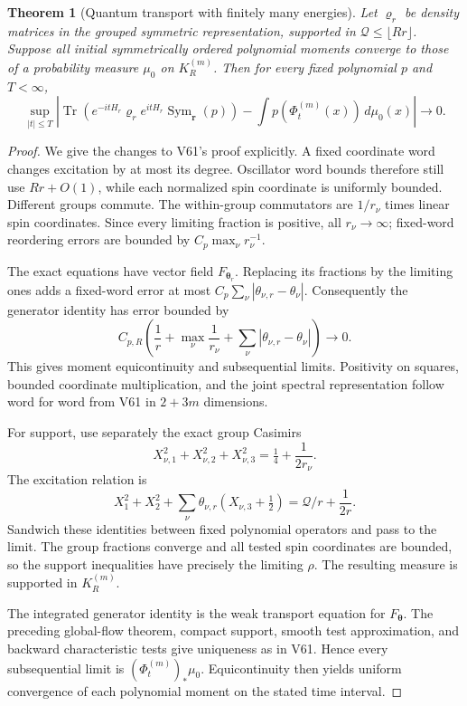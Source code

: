 \documentclass[11pt]{article}
\newtheorem{theorem}{Theorem}[section]
\theoremstyle{remark}
\begin{document}
\begin{theorem}[Quantum transport with finitely many energies]
\label{thm:v20v62-transport}
Let \(\varrho_r\) be density matrices in the grouped
symmetric representation, supported in
\(\mathcal Q\leq\lfloor Rr\rfloor\).  Suppose all initial
symmetrically ordered polynomial moments converge to
those of a probability measure \(\mu_0\) on \(K_R^{(m)}\).
Then for every fixed polynomial \(p\) and \(T<\infty\),
\[
 \sup_{|t|\leq T}\left|
 \operatorname{Tr}\!\left(e^{-itH_r}\varrho_re^{itH_r}
                         \operatorname{Sym}_{\boldsymbol r}(p)\right)
   -\int p(\Phi_t^{(m)}(x))\,d\mu_0(x)\right|
                          \longrightarrow0 .
\]
\end{theorem}
\begin{proof}
We give the changes to V61's proof explicitly.
A fixed coordinate word changes excitation by at most
its degree.  Oscillator word bounds therefore still
use \(Rr+O(1)\), while each normalized spin coordinate
is uniformly bounded.  Different groups commute.
The within-group commutators are \(1/r_\nu\) times
linear spin coordinates.  Since every limiting fraction
is positive, all \(r_\nu\to\infty\); fixed-word
reordering errors are bounded by
\(C_p\max_\nu r_\nu^{-1}\).

The exact equations have vector field \(F_{\boldsymbol\theta_r}\).
Replacing its fractions by the limiting ones adds a
fixed-word error at most
\(C_p\sum_\nu|\theta_{\nu,r}-\theta_\nu|\).
Consequently the generator identity has error bounded by
\[
 C_{p,R}\left(\frac1r+\max_\nu\frac1{r_\nu}
                    +\sum_\nu|\theta_{\nu,r}-\theta_\nu|\right)
                         \longrightarrow0 .
\]
This gives moment equicontinuity and subsequential limits.
Positivity on squares, bounded coordinate multiplication,
and the joint spectral representation follow word for
word from V61 in \(2+3m\) dimensions.

For support, use separately the exact group Casimirs
\[
 X_{\nu,1}^2+X_{\nu,2}^2+X_{\nu,3}^2
                   =\tfrac14+\frac1{2r_\nu}.
\]
The excitation relation is
\[
 X_1^2+X_2^2+\sum_\nu\theta_{\nu,r}
                      (X_{\nu,3}+\tfrac12)
                   =\mathcal Q/r+\frac1{2r}.
\]
Sandwich these identities between fixed polynomial
operators and pass to the limit.  The group fractions
converge and all tested spin coordinates are bounded,
so the support inequalities have precisely the limiting
\(\rho\).  The resulting measure is supported in
\(K_R^{(m)}\).

The integrated generator identity is the weak transport
equation for \(F_{\boldsymbol\theta}\).  The preceding
global-flow theorem, compact support, smooth test
approximation, and backward characteristic tests give
uniqueness as in V61.  Hence every subsequential limit
is \((\Phi_t^{(m)})_*\mu_0\).  Equicontinuity then yields
uniform convergence of each polynomial moment on the
stated time interval.
\end{proof}
\end{document}
